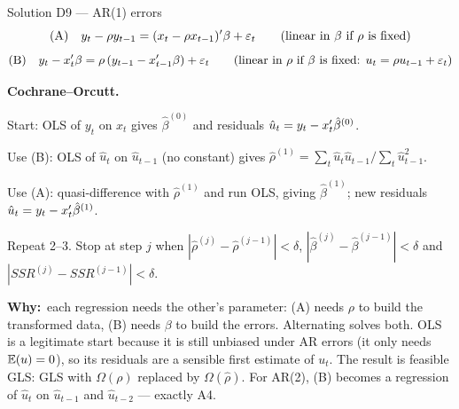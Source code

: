\documentclass[11pt]{article}
\newcommand{\step}[1]{\par\smallskip\noindent\textbf{\textcolor{qnavy}{#1}}\quad\ignorespaces}
\newcommand{\Why}{\textbf{\textcolor{whyline}{Why:}}\ }
\begin{document}
\begin{solbox}{Solution D9 --- AR(1) errors}
\[
  \text{(A)}\quad y_{t} - \rho y_{t-1} = (x_{t} - \rho x_{t-1})^{\prime}\beta + \varepsilon_{t}
  \qquad\text{(linear in $\beta$ if $\rho$ is fixed)}
\]
\[
  \text{(B)}\quad y_{t} - x_{t}^{\prime}\beta = \rho\,(y_{t-1} - x_{t-1}^{\prime}\beta) + \varepsilon_{t}
  \qquad\text{(linear in $\rho$ if $\beta$ is fixed: } u_{t} = \rho u_{t-1} + \varepsilon_{t})
\]
\step{Cochrane--Orcutt.}
\begin{flatnum}
  \item Start: OLS of $y_{t}$ on $x_{t}$ gives $\hat\beta^{(0)}$ and residuals $\hat u_{t} = y_{t} - x_{t}^{\prime}\hat\beta^{(0)}$.
  \item Use (B): OLS of $\hat u_{t}$ on $\hat u_{t-1}$ (no constant) gives
        $\hat\rho^{(1)} = \sum_{t}\hat u_{t}\hat u_{t-1}\big/\sum_{t}\hat u_{t-1}^{2}$.
  \item Use (A): quasi-difference with $\hat\rho^{(1)}$ and run OLS, giving $\hat\beta^{(1)}$; new residuals
        $\hat u_{t} = y_{t} - x_{t}^{\prime}\hat\beta^{(1)}$.
  \item Repeat 2--3. Stop at step $j$ when $|\hat\rho^{(j)} - \hat\rho^{(j-1)}| < \delta$,
        $|\hat\beta^{(j)} - \hat\beta^{(j-1)}| < \delta$ and $|SSR^{(j)} - SSR^{(j-1)}| < \delta$.
\end{flatnum}
\begin{why}\Why each regression needs the other's parameter: (A) needs $\rho$ to build the
transformed data, (B) needs $\beta$ to build the errors. Alternating solves both. OLS is a
legitimate start because it is still unbiased under AR errors (it only needs $\mathbb{E}(u) = 0$), so
its residuals are a sensible first estimate of $u_{t}$. The result is feasible GLS: GLS with
$\Omega(\rho)$ replaced by $\Omega(\hat\rho)$. For AR(2), (B) becomes a regression of $\hat u_{t}$ on
$\hat u_{t-1}$ and $\hat u_{t-2}$ --- exactly A4.\end{why}
\end{solbox}
\end{document}
